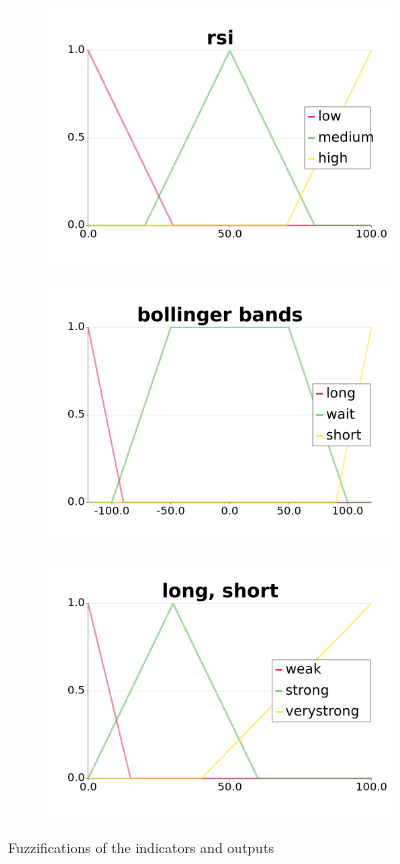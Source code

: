 \documentclass{article}
\begin{document}
\begin{figure}[ht]
    \begin{subfigure}{.45\textwidth}
        \centering
        \includegraphics[width = \linewidth]{rsi.png}
    \end{subfigure}
    \begin{subfigure}{.45\textwidth}
        \centering
        \includegraphics[width = \linewidth]{bb.png}
    \end{subfigure}
    \begin{subfigure}{\textwidth}
        \centering
        \includegraphics[width = 0.5\linewidth]{ls.png}
    \end{subfigure}

    \caption{Fuzzifications of the indicators and outputs}
    \label{fig:1}
\end{figure}
\FloatBarrier
\end{document}
